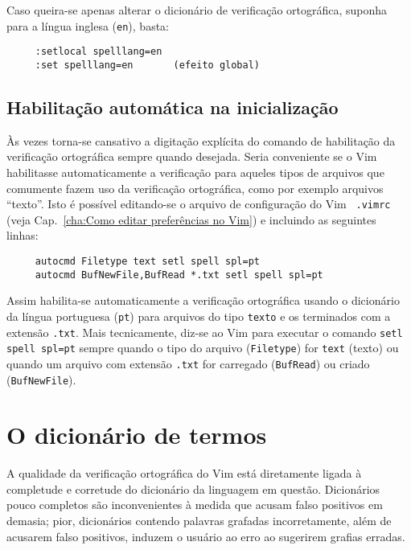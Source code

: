 Caso queira-se apenas alterar o dicionário de verificação ortográfica, suponha
para a língua inglesa ({\tt en}), basta:

\begin{verbatim}
     :setlocal spelllang=en
     :set spelllang=en       (efeito global)
\end{verbatim}

\subsection{Habilitação automática na inicialização}

Às vezes torna-se cansativo a digitação explícita do comando de habilitação da
verificação ortográfica sempre quando desejada.  Seria conveniente se o Vim
habilitasse automaticamente a verificação para aqueles tipos de arquivos que
comumente fazem uso da verificação ortográfica, como por exemplo arquivos
``texto''. Isto é possível editando-se o arquivo de configuração do Vim {\tt
.vimrc} (veja Cap.~\ref{cha:Como editar preferências no Vim}) e incluindo as
seguintes linhas: 

\begin{verbatim}
     autocmd Filetype text setl spell spl=pt
     autocmd BufNewFile,BufRead *.txt setl spell spl=pt
\end{verbatim}

Assim habilita-se automaticamente a verificação ortográfica usando o
dicionário da língua portuguesa ({\tt pt}) para arquivos do tipo {\tt texto} e
os terminados com a extensão {\tt .txt}. Mais tecnicamente, diz-se ao Vim para
executar o comando \verb|setl spell spl=pt| sempre quando o tipo do arquivo
({\tt Filetype}) for {\tt text} (texto) ou quando um arquivo com extensão {\tt .txt}
for carregado ({\tt BufRead}) ou criado ({\tt BufNewFile}).

\section{O dicionário de termos}

A qualidade da verificação ortográfica do Vim está diretamente ligada à
completude e corretude do dicionário da linguagem em questão. Dicionários
pouco completos são inconvenientes à medida que acusam falso positivos em
demasia; pior, dicionários contendo palavras grafadas incorretamente, além de
acusarem falso positivos, induzem o usuário ao erro ao sugerirem grafias
erradas.

